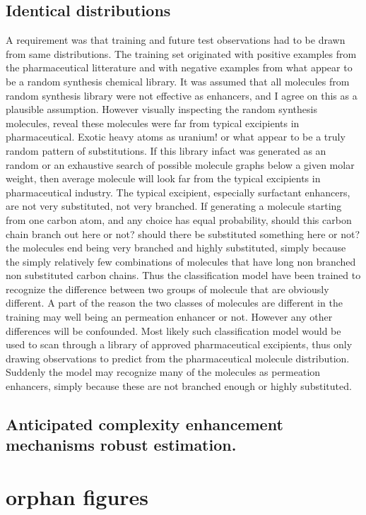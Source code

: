 \subsection{Identical distributions}
A requirement was that training and future test observations had to be drawn from same distributions. The training set originated with positive examples from the pharmaceutical litterature and with negative examples from what appear to be a random synthesis chemical library. It was assumed that all molecules from random synthesis library were not effective as enhancers, and I agree on this as a plausible assumption. However visually inspecting the random synthesis molecules, reveal these molecules were far from typical excipients in pharmaceutical. Exotic heavy atoms as uranium! or what appear to be a truly random pattern of substitutions. If this library infact was generated as an random or an exhaustive search of possible molecule graphs below a given molar weight, then average molecule will look far from the typical excipients in pharmaceutical industry. The typical excipient, especially surfactant enhancers, are not very substituted, not very branched. If generating a molecule starting from one carbon atom, and any choice has equal probability, should this carbon chain branch out here or not? should there be substituted something here or not? the molecules end being very branched and highly substituted, simply because the simply relatively few combinations of molecules that have long non branched non substituted carbon chains. Thus the classification model have been trained to recognize the difference between two groups of molecule that are obviously different. A part of the reason the two classes of molecules are different in the training may well being an permeation enhancer or not. However any other differences will be confounded. Most likely such classification model would be used to scan through a library of approved pharmaceutical excipients, thus only drawing observations to predict from the pharmaceutical molecule distribution. Suddenly the model may recognize many of the molecules as permeation enhancers, simply because these are not branched enough or highly substituted.

\subsection{Anticipated complexity enhancement mechanisms robust estimation.}
\label{modelComplexity}

\section{orphan figures}





